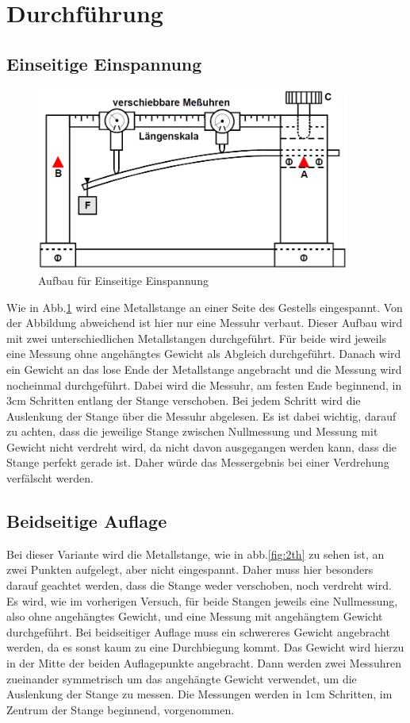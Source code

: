\section{Durchführung}
\label{sec:Durchführung}

\subsection{Einseitige Einspannung}
\begin{figure}
    \centering
    \includegraphics[height=6cm]{data/bild_3}
    \caption{Aufbau für Einseitige Einspannung}
    \label{fig:aufbau1}
\end{figure}

Wie in Abb.\ref{fig:aufbau1} wird eine Metallstange an einer Seite des Gestells eingespannt. Von der Abbildung abweichend ist hier nur eine Messuhr
verbaut. Dieser Aufbau wird mit zwei unterschiedlichen Metallstangen durchgeführt. Für beide wird jeweils eine Messung ohne angehängtes
Gewicht als Abgleich durchgeführt. Danach wird ein Gewicht an das lose Ende der Metallstange angebracht und 
die Messung wird nocheinmal durchgeführt. Dabei wird die Messuhr, am festen Ende beginnend, in 3$\si{\centi\meter}$ Schritten entlang der 
Stange verschoben. Bei jedem Schritt wird die Auslenkung der Stange über die Messuhr abgelesen. Es ist dabei wichtig, darauf zu achten,
dass die jeweilige Stange zwischen Nullmessung und Messung mit Gewicht nicht verdreht wird, da nicht davon ausgegangen werden kann, dass 
die Stange perfekt gerade ist. Daher würde das Messergebnis bei einer Verdrehung verfälscht werden. 

\subsection{Beidseitige Auflage}

Bei dieser Variante wird die Metallstange, wie in abb.\ref{fig:2th} zu sehen ist, an zwei Punkten aufgelegt, aber nicht eingespannt. Daher muss 
hier besonders darauf geachtet werden, dass die Stange weder verschoben, noch verdreht wird. Es wird, wie im vorherigen Versuch, für 
beide Stangen jeweils eine Nullmessung, also ohne angehängtes Gewicht, und eine Messung mit angehängtem Gewicht durchgeführt. Bei beidseitiger Auflage muss ein schwereres Gewicht angebracht werden, da es sonst kaum zu eine Durchbiegung kommt.
Das Gewicht wird hierzu in der Mitte der beiden Auflagepunkte angebracht. Dann werden zwei Messuhren zueinander symmetrisch um das 
angehängte Gewicht verwendet, um die Auslenkung der Stange zu messen. Die Messungen werden in 1$\si{\centi\meter}$ Schritten, im Zentrum 
der Stange beginnend, vorgenommen. 